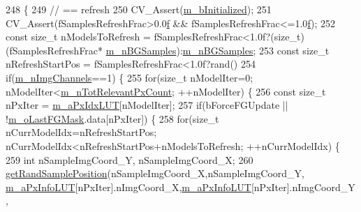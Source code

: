 \begin{DoxyCode}
248                                                                                               \{
249     \textcolor{comment}{// == refresh}
250     CV\_Assert(\mbox{\hyperlink{class_background_subtractor_l_b_s_p_a55cea104a0924fd50d5bed0912828a7e}{m\_bInitialized}});
251     CV\_Assert(fSamplesRefreshFrac>0.0\mbox{\hyperlink{rings_8cpp_a77369fc4d5326a16d2c603e032023528}{f}} && fSamplesRefreshFrac<=1.0\mbox{\hyperlink{rings_8cpp_a77369fc4d5326a16d2c603e032023528}{f}});
252     \textcolor{keyword}{const} \textcolor{keywordtype}{size\_t} nModelsToRefresh = fSamplesRefreshFrac<1.0f?(size\_t)(fSamplesRefreshFrac*
      \mbox{\hyperlink{class_background_subtractor_su_b_s_e_n_s_e_ad783b71b5b942c4018d27cf38b7d7225}{m\_nBGSamples}}):\mbox{\hyperlink{class_background_subtractor_su_b_s_e_n_s_e_ad783b71b5b942c4018d27cf38b7d7225}{m\_nBGSamples}};
253     \textcolor{keyword}{const} \textcolor{keywordtype}{size\_t} nRefreshStartPos = fSamplesRefreshFrac<1.0f?rand()%
254     \textcolor{keywordflow}{if}(\mbox{\hyperlink{class_background_subtractor_l_b_s_p_ab3467ebee2c5d1249061ccd704cc0584}{m\_nImgChannels}}==1) \{
255         \textcolor{keywordflow}{for}(\textcolor{keywordtype}{size\_t} nModelIter=0; nModelIter<\mbox{\hyperlink{class_background_subtractor_l_b_s_p_ac3b54f4d2dfa3a576475214f26501d85}{m\_nTotRelevantPxCount}}; ++nModelIter) \{
256             \textcolor{keyword}{const} \textcolor{keywordtype}{size\_t} nPxIter = \mbox{\hyperlink{class_background_subtractor_l_b_s_p_a06b4f0d3f24fa08bccd3c9eca085713e}{m\_aPxIdxLUT}}[nModelIter];
257             \textcolor{keywordflow}{if}(bForceFGUpdate || !\mbox{\hyperlink{class_background_subtractor_l_b_s_p_adb6dc0af596c5592c91f9d8faa5c8a4b}{m\_oLastFGMask}}.data[nPxIter]) \{
258                 \textcolor{keywordflow}{for}(\textcolor{keywordtype}{size\_t} nCurrModelIdx=nRefreshStartPos; nCurrModelIdx<nRefreshStartPos+nModelsToRefresh;
       ++nCurrModelIdx) \{
259                     \textcolor{keywordtype}{int} nSampleImgCoord\_Y, nSampleImgCoord\_X;
260                     \mbox{\hyperlink{_rand_utils_8h_aad1feb1fa9a8e94c8fac60b9a01e1a5b}{getRandSamplePosition}}(nSampleImgCoord\_X,nSampleImgCoord\_Y,
      \mbox{\hyperlink{class_background_subtractor_l_b_s_p_a74e73d4832ccdef652d93756582024db}{m\_aPxInfoLUT}}[nPxIter].nImgCoord\_X,\mbox{\hyperlink{class_background_subtractor_l_b_s_p_a74e73d4832ccdef652d93756582024db}{m\_aPxInfoLUT}}[nPxIter].nImgCoord\_Y,

\end{DoxyCode}
